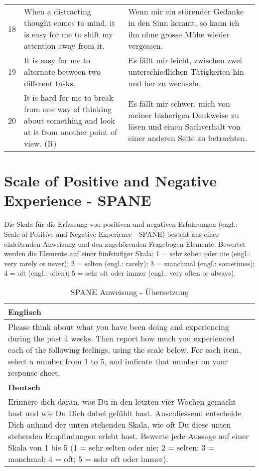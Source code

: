 \begin{RaggedRight}
\begin{center}
\begin{longtable}[t]{|l|p{6.6 cm}|p{6.6 cm}|}
        18 & When a distracting thought comes to mind, it is easy for me to shift my attention away from it. & Wenn mir ein störender Gedanke in den Sinn kommt, so kann ich ihn ohne grosse Mühe wieder vergessen.  \\
        19 & It is easy for me to alternate between two different tasks. & Es fällt mir leicht, zwischen zwei unterschiedlichen Tätigkeiten hin und her zu wechseln. \\
        20 & It is hard for me to break from one way of thinking about something and look at it from another point of view. (R) & Es fällt mir schwer, mich von meiner bisherigen Denkweise zu lösen und einen Sachverhalt von einer anderen Seite zu betrachten. \\ \hline
    \end{longtable}
	\label{tab:AcsUebersetzung}
\end{center}

\section{Scale of Positive and Negative Experience - SPANE}\label{appendix.spane}
Die Skala für die Erfassung von positiven und negativen Erfahrungen (engl.: Scale of Positive and Negative Experience - SPANE) \cite{Diener:2010} besteht aus einer einleitenden Anweisung und den zugehörenden Fragebogen-Elemente. Bewertet werden die Elemente auf einer fünfstufiger Skala: 1 = sehr selten oder nie (engl.: very rarely or never); 2 = selten (engl.: rarely); 3 = manchmal (engl.: sometimes); 4 = oft (engl.: often); 5 = sehr oft oder immer (engl.: very often or always). 

\begin{center}
    \begin{longtable}[t]{|p{15 cm}|}
    \caption{SPANE Anweisung - Übersetzung} \\ \hline
        \textbf{Englisch} \\ \hline
        Please think about what you have been doing and experiencing during the past 4 weeks. Then report how much you experienced each of the following feelings, using the scale below. For each item, select a number from 1 to 5, and indicate that number on your response sheet. \\ \hline
        \textbf{Deutsch} \\ \hline 
        Erinnere dich daran, was Du in den letzten vier Wochen gemacht hast und wie Du Dich dabei gefühlt hast. Anschliessend entscheide Dich anhand der unten stehenden Skala, wie oft Du diese unten stehenden Empfindungen erlebt hast. Bewerte jede Aussage auf einer Skala von 1 bis 5 (1 = sehr selten oder nie; 2 = selten; 3 = manchmal; 4 = oft; 5 = sehr oft oder immer). \\ \hline   
    \end{longtable}
	\label{tab:SpaneAnweisung}
\end{center}


\end{RaggedRight}
